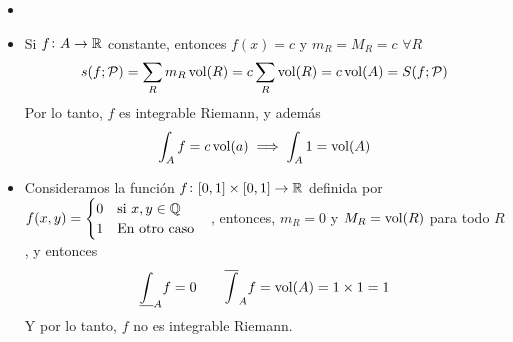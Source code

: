 \begin{example}
    \begin{itemize}
        \item[]
        \item Si $f \colon A \to \mathbb{R}$ constante, entonces  $f(x) = c$ y
            $m_R = M_R = c$ $\forall R$
            \[
                s(f;\mathcal{P}) = \sum_R m_R \operatorname{vol}(R) = c \sum_R \operatorname{vol}(R)
                = c\operatorname{vol}(A) = S(f;\mathcal{P})
            \]
            Por lo tanto, $f$ es integrable Riemann, y además
            \[
                \int_A f = c\operatorname{vol}(a) \implies \int_A 1 = \operatorname{vol}(A)
            \]
        \item Consideramos la función $f \colon [0,1] \times [0,1] \to \mathbb{R}$
            definida por $f(x,y) = \begin{cases}
                0 \quad \text{si } x,y \in \mathbb{Q} \\
                1 \quad \text{En otro caso}
            \end{cases}$, entonces, $m_R = 0$ y $M_R = \operatorname{vol}(R)$ para todo
            $R$, y entonces
            \[
                \underline{\int}_A f = 0 \qquad
                \overline{\int}_A f = \operatorname{vol}(A) = 1\times1 = 1
            \]
            Y por lo tanto, $f$ no es integrable Riemann.
    \end{itemize}
\end{example}

